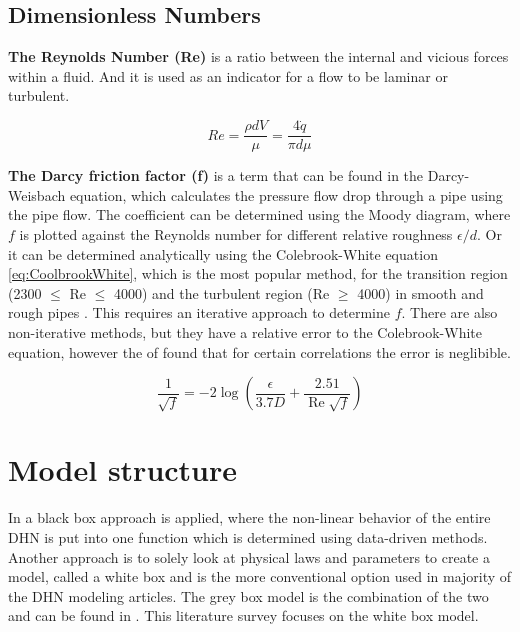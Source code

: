 \subsection{Dimensionless Numbers}
\textbf{The Reynolds Number (Re)} is a ratio between the internal and vicious forces within a fluid. And it is used as an indicator for a flow to be laminar or turbulent. 

\begin{equation}\label{eq::Re}
R e=\frac{\rho d V}{\mu}=\frac{4 \dot{q}}{\pi d \mu}
\end{equation}

\textbf{The Darcy friction factor (f)} is a term that can be found in the Darcy-Weisbach equation, which calculates the pressure flow drop through a pipe using the pipe flow. The coefficient can be determined using the Moody diagram, where $f$ is plotted against the Reynolds number for different relative roughness $\epsilon / d$. Or it can be determined analytically using the Colebrook-White equation \ref{eq:CoolbrookWhite}, which is the most popular method, for the transition region (2300 $\leq$ Re $\leq$ 4000) and the turbulent region (Re $\geq$ 4000) in smooth and rough pipes \cite{Darcyfrictionfactor}. This requires an iterative approach to determine $f$. There are also non-iterative methods, but they have a relative error to the Colebrook-White equation, however the of \cite{Darcyfrictionfactor} found that for certain correlations the error is neglibible.

\begin{equation}\label{eq:CoolbrookWhite}
\frac{1}{\sqrt{f}}=-2 \log \left(\frac{\epsilon}{3.7 D}+\frac{2.51}{\operatorname{Re} \sqrt{f}}\right)
\end{equation}


\section{Model structure}
In \cite{GUELPA2016586}\cite{KECEBAS2012339} a black box approach is applied, where the non-linear behavior of the entire DHN is put into one function which is determined using data-driven methods. Another approach is to solely look at physical laws and parameters to create a model, called a white box and is the more conventional option used in majority of the DHN modeling articles. The grey box model is the combination of the two and can be found in \cite{grey1}\cite{grey2}. This literature survey focuses on the white box model.

